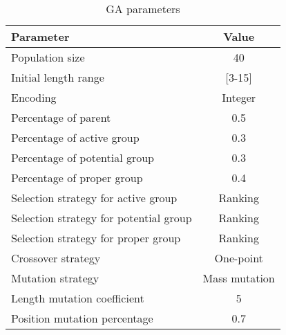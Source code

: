 \begin{table}[!htb]
\centering
\caption{GA parameters}
\begin{adjustbox}{width=0.45\textwidth}
\label{tab:ga}
\begin{tabular}{lc}
\toprule
Parameter								&  Value  \\
\midrule
Population size							& 40        \\
Initial length range					& [3-15]    \\
Encoding								& Integer   \\
Percentage of parent                    & 0.5   \\
Percentage of active group				& 0.3   \\
Percentage of potential group			& 0.3   \\
Percentage of proper group				& 0.4   \\
Selection strategy for  active group	& Ranking   \\
Selection strategy for potential group	& Ranking   \\
Selection strategy for proper group	    & Ranking   \\
Crossover strategy			    		& One-point \\
Mutation strategy			    		& Mass mutation \\
Length mutation coefficient             & 5 \\
Position mutation percentage            & 0.7 \\
\bottomrule
\end{tabular}
\end{adjustbox}
\end{table}
